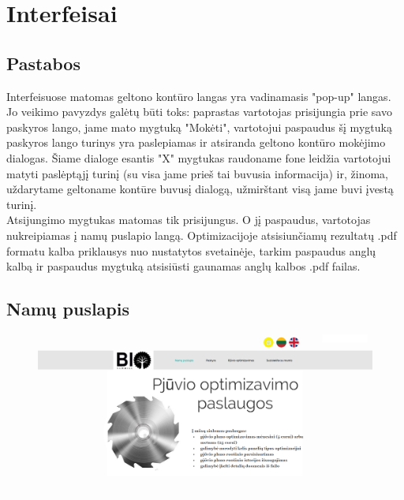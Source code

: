 \documentclass[a4paper,12pt]{article}
\begin{document}
\section{Interfeisai}

\subsection{Pastabos}
Interfeisuose matomas geltono kontūro langas yra vadinamasis "pop-up" langas. Jo veikimo pavyzdys galėtų būti toks: paprastas vartotojas prisijungia prie savo paskyros lango, jame mato mygtuką "Mokėti", vartotojui paspaudus šį mygtuką paskyros lango turinys yra paslepiamas ir atsiranda geltono kontūro mokėjimo dialogas. Šiame dialoge esantis "X" mygtukas raudoname fone leidžia vartotojui matyti paslėptąjį turinį (su visa jame prieš tai buvusia informacija) ir, žinoma, uždarytame geltoname kontūre buvusį dialogą, užmirštant visą jame buvi įvestą turinį.\\
Atsijungimo mygtukas matomas tik prisijungus. O jį paspaudus, vartotojas nukreipiamas į namų puslapio langą.
Optimizacijoje atsisiunčiamų rezultatų .pdf formatu kalba priklausys nuo nustatytos svetainėje, tarkim paspaudus anglų kalbą ir paspaudus mygtuką atsisiūsti gaunamas anglų kalbos .pdf failas.


\subsection{Namų puslapis}
\begin{figure}[!tph]
\hspace{-2cm}
\centering
\includegraphics[scale=0.45]{interfeisai/pagrindinis}
\label{fig:verticalcell}
\end{figure}
\end{document}
